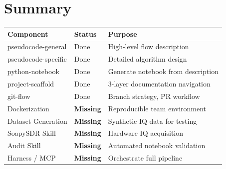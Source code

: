 \documentclass[11pt]{article}
\begin{document}
\section*{Summary}

\begin{longtable}{lll}
\toprule
\textbf{Component} & \textbf{Status} & \textbf{Purpose} \\
\midrule
\endhead
pseudocode-general & Done & High-level flow description \\
pseudocode-specific & Done & Detailed algorithm design \\
python-notebook & Done & Generate notebook from description \\
project-scaffold & Done & 3-layer documentation navigation \\
git-flow & Done & Branch strategy, PR workflow \\
Dockerization & \textbf{Missing} & Reproducible team environment \\
Dataset Generation & \textbf{Missing} & Synthetic IQ data for testing \\
SoapySDR Skill & \textbf{Missing} & Hardware IQ acquisition \\
Audit Skill & \textbf{Missing} & Automated notebook validation \\
Harness / MCP & \textbf{Missing} & Orchestrate full pipeline \\
\bottomrule
\end{longtable}
\end{document}
